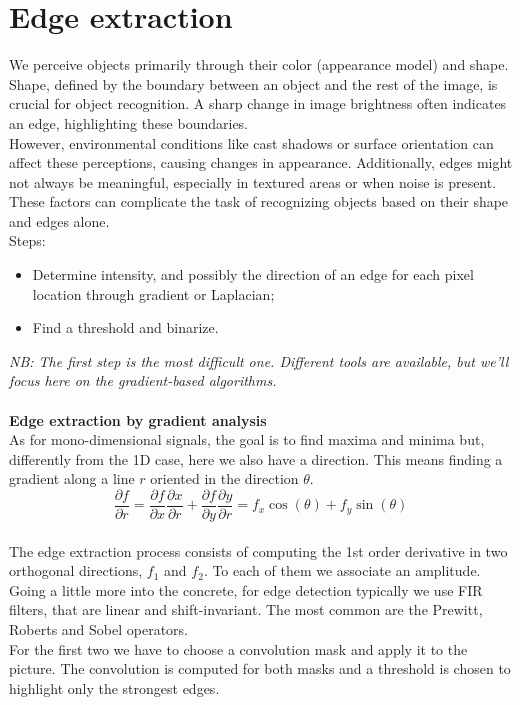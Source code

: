 \section{Edge extraction}
We perceive objects primarily through their color (appearance model) and shape. Shape, defined by the boundary between an object and the rest of the image, is crucial for object recognition. A sharp change in image brightness often indicates an edge, highlighting these boundaries.
\\
However, environmental conditions like cast shadows or surface orientation can affect these perceptions, causing changes in appearance. Additionally, edges might not always be meaningful, especially in textured areas or when noise is present. These factors can complicate the task of recognizing objects based on their shape and edges alone.
\\Steps:
\begin{itemize}
    \item Determine intensity, and possibly the direction of an edge for each pixel location through gradient or Laplacian;
    \item Find a threshold and binarize.
\end{itemize}
\textit{NB: The first step is the most difficult one. Different tools are available, but we’ll focus here on the gradient-based algorithms.}
\\\\
\textbf{Edge extraction by gradient analysis}\\
As for mono-dimensional signals, the goal is to find maxima and minima but, differently from the 1D case, here we also have a direction. This means finding a gradient along a line $r$ oriented in the direction $\theta$.
\[
\frac{\partial f}{\partial r} = \frac{\partial f}{\partial x}\frac{\partial x}{\partial r} + \frac{\partial f}{\partial y} \frac{\partial y}{\partial r} = f_x \cos(\theta) + f_y \sin(\theta)
\]
\\
The edge extraction process consists of computing the 1st order derivative in two orthogonal directions, $f_1$ and $f_2$. To each of them we associate an amplitude.
Going a little more into the concrete, for edge detection typically we use FIR filters, that are linear and shift-invariant. The most common are the Prewitt, Roberts and Sobel operators.
\\
For the first two we have to choose a convolution mask and apply it to the picture. The convolution is computed for both masks and a threshold is chosen to highlight only the strongest edges.
